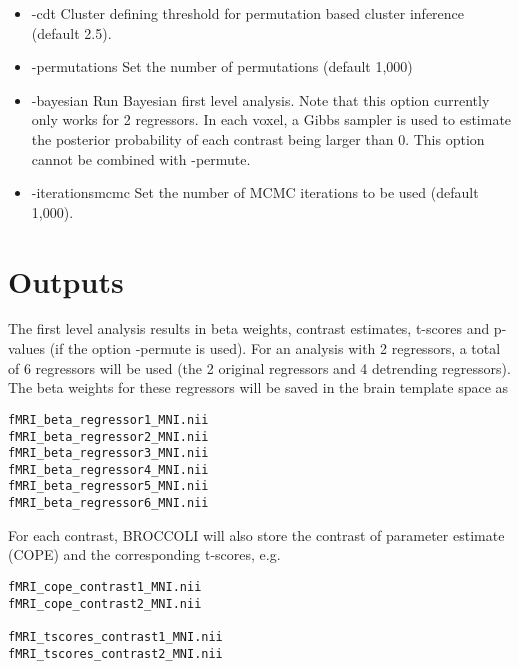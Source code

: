 \begin{itemize}
\newpage 

\item -cdt 
\newline \newline Cluster defining threshold for permutation based cluster inference (default 2.5). 

\item -permutations 
\newline \newline Set the number of permutations (default 1,000)

\item -bayesian 
\newline \newline Run Bayesian first level analysis.  Note that this option currently only works for 2 regressors. In each voxel, a Gibbs sampler is used to estimate the posterior probability of each contrast being larger than 0. This option cannot be combined with -permute.

\item -iterationsmcmc 
\newline \newline Set the number of MCMC iterations to be used (default 1,000).

\end{itemize}

\section{Outputs}

The first level analysis results in beta weights, contrast estimates, t-scores and p-values (if the option -permute is used). For an analysis with 2 regressors, a total of 6 regressors will be used (the 2 original regressors and 4 detrending regressors). The beta weights for these regressors will be saved in the brain template space as

\begin{verbatim}
fMRI_beta_regressor1_MNI.nii 
fMRI_beta_regressor2_MNI.nii 
fMRI_beta_regressor3_MNI.nii 
fMRI_beta_regressor4_MNI.nii 
fMRI_beta_regressor5_MNI.nii 
fMRI_beta_regressor6_MNI.nii 
\end{verbatim}

For each contrast, BROCCOLI will also store the contrast of parameter estimate (COPE) and the corresponding t-scores, e.g.

\begin{verbatim}
fMRI_cope_contrast1_MNI.nii  
fMRI_cope_contrast2_MNI.nii  

fMRI_tscores_contrast1_MNI.nii
fMRI_tscores_contrast2_MNI.nii
\end{verbatim}

